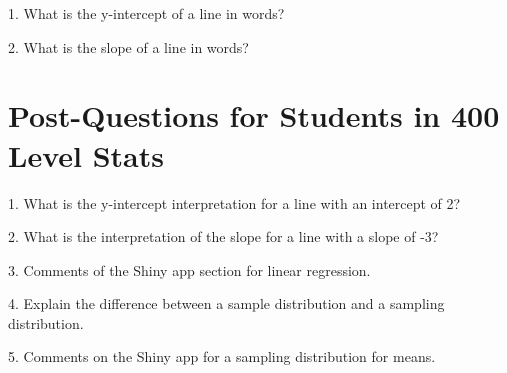 \documentclass[11pt]{amsart}
\begin{document}
1. What is the y-intercept of a line in words?

2. What is the slope of a line in words?


\section{Post-Questions for Students in 400 Level Stats}

1.  What is the y-intercept interpretation for a line with an intercept of 2?

2. What is the interpretation of the slope for a line with a slope of -3?

3. Comments of the Shiny app section for linear regression.


4. Explain the difference between a sample distribution and a sampling distribution.


5. Comments on the Shiny app for a sampling distribution for means.
\end{document}
